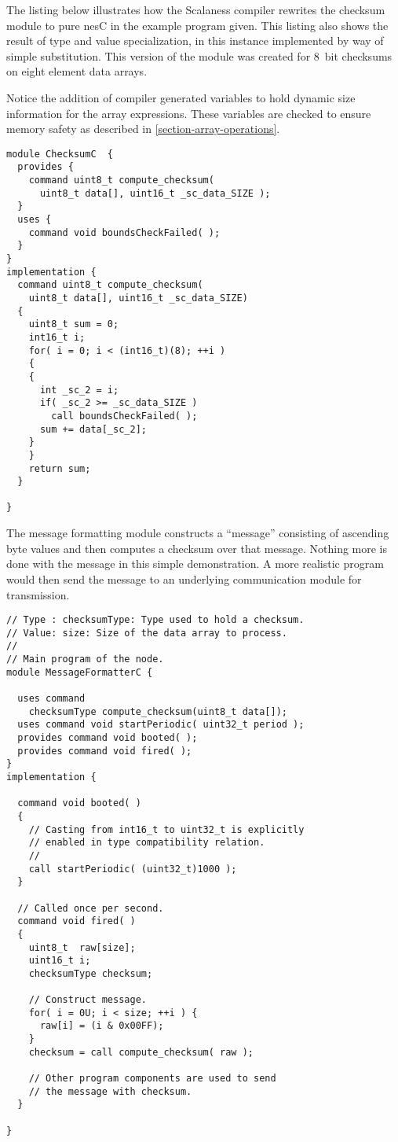 The listing below illustrates how the Scalaness compiler rewrites the checksum module to pure
nesC in the example program given. This listing also shows the result of type and value
specialization, in this instance implemented by way of simple substitution. This version of the
module was created for 8~bit checksums on eight element data arrays.

Notice the addition of compiler generated variables to hold dynamic size information for the
array expressions. These variables are checked to ensure memory safety as described in
\autoref{section-array-operations}.

\singlespace
\vspace{1.0ex}
\begin{lstlisting}[language=nesC]
module ChecksumC  {
  provides {
    command uint8_t compute_checksum(
      uint8_t data[], uint16_t _sc_data_SIZE );
  }
  uses {
    command void boundsCheckFailed( );
  }
}
implementation {
  command uint8_t compute_checksum(
    uint8_t data[], uint16_t _sc_data_SIZE) 
  {
    uint8_t sum = 0;
    int16_t i;
    for( i = 0; i < (int16_t)(8); ++i )
    {
    {
      int _sc_2 = i;
      if( _sc_2 >= _sc_data_SIZE )
        call boundsCheckFailed( );
      sum += data[_sc_2];
    }
    }
    return sum;
  }

}
\end{lstlisting}
\vspace{1.0ex}
\primaryspacing

The message formatting module constructs a ``message'' consisting of ascending byte values and
then computes a checksum over that message. Nothing more is done with the message in this simple
demonstration. A more realistic program would then send the message to an underlying
communication module for transmission.

\singlespace
\vspace{1.0ex}
\begin{lstlisting}[language=nesC]
// Type : checksumType: Type used to hold a checksum.
// Value: size: Size of the data array to process.
//
// Main program of the node.
module MessageFormatterC {
    
  uses command
    checksumType compute_checksum(uint8_t data[]);
  uses command void startPeriodic( uint32_t period );
  provides command void booted( );
  provides command void fired( );
}
implementation {
    
  command void booted( )
  {
    // Casting from int16_t to uint32_t is explicitly
    // enabled in type compatibility relation.
    //
    call startPeriodic( (uint32_t)1000 );
  }
    
  // Called once per second.
  command void fired( )
  {
    uint8_t  raw[size];
    uint16_t i;
    checksumType checksum;
        
    // Construct message.
    for( i = 0U; i < size; ++i ) {
      raw[i] = (i & 0x00FF);
    }
    checksum = call compute_checksum( raw );
        
    // Other program components are used to send
    // the message with checksum.
  }
    
}
\end{lstlisting}
\vspace{1.0ex}
\primaryspacing

